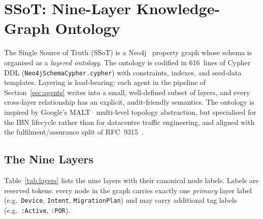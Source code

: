 \documentclass[acmtog]{acmart}
\renewcommand\_{\textunderscore\allowbreak}
\begin{document}
\section{SSoT: Nine-Layer Knowledge-Graph Ontology}\label{sec:ssot}

The Single Source of Truth (SSoT) is a Neo4j~\cite{neo4j} property
graph whose schema is organised as a \emph{layered ontology}. The
ontology is codified in 616~lines of Cypher DDL
(\texttt{Neo4j\_Schema\_Cypher.cypher}) with constraints, indexes,
and seed-data templates. Layering is load-bearing: each agent in the
pipeline of Section~\ref{sec:agents} writes into a small,
well-defined subset of layers, and every cross-layer relationship
has an explicit, audit-friendly semantics. The ontology is inspired
by Google's MALT~\cite{malt} multi-level topology abstraction, but
specialised for the IBN lifecycle rather than for datacentre traffic
engineering, and aligned with the fulfilment/assurance split of
RFC~9315~\cite{rfc9315}.


\subsection{The Nine Layers}\label{sec:ssot:layers}

Table~\ref{tab:layers} lists the nine layers with their canonical
node labels. Labels are reserved tokens: every node in the graph
carries exactly one \emph{primary} layer label (e.g.\
\texttt{Device}, \texttt{Intent}, \texttt{MigrationPlan}) and may
carry additional tag labels (e.g.\ \texttt{:Active}, \texttt{:POR}).
\end{document}
